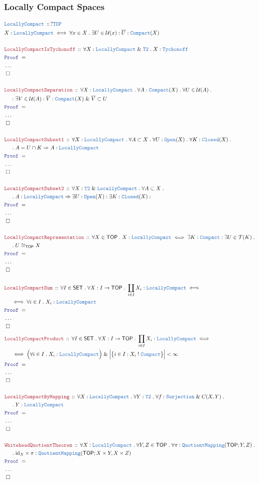 \documentclass[12pt]{scrartcl}
\newcommand{\TYPE}[1]{\textcolor{NavyBlue}{\mathtt{#1}}}
\newcommand{\LOGIC}[1]{\textcolor{Blue}{\mathtt{#1}}}
\newcommand{\THM}[1]{\textcolor{Maroon}{\mathtt{#1}}}
\renewcommand{\.}{\; . \;}
\newcommand{\IsNot}{\; ! \;}
\newcommand{\Theorem}[2]{& \THM{#1} \, :: \, #2 \\ & \Proof = \\ }
\newcommand{\DeclareType}[2]{& \TYPE{#1} \, :: \, #2 \\}
\newcommand{\DefineType}[3]{& #1 : \TYPE{#2} \iff #3 \\}
\newcommand{\NewLine}{\\ & \kern 1pc}
\newcommand{\Page}[1]{ \begin{align*} #1 \end{align*}   }
\newcommand{\NoProof}{ & \ldots \\ \EndProof}
\renewcommand{\And}{\; \& \;}
\newcommand{\Imply}{\Rightarrow}
\DeclareMathOperator*{\id}{id}
\newcommand{\QED}{\; \square}
\newcommand{\EndProof}{& \QED \\}
\newcommand{\Proof}{\LOGIC{Proof} \; }
\newcommand{\SET}{\mathsf{SET}}
\newcommand{\TOP}{\mathsf{TOP}}
\newcommand{\T}{\mathcal{T}}
\newcommand{\U}{\mathcal{U}}
\begin{document}
\subsubsection{Locally Compact Spaces}
\Page{
	\DeclareType{LocallyCompact}{?\TYPE{TOP}}
	\DefineType{X}{LocallyCompact}{\forall x \in X \. \exists U \in \U(x) : \overline{U} : \TYPE{Compact}(X) }
	\\
	\Theorem{LocallyCompactIsTychonoff}{\forall X : \TYPE{LocallyCompact} \And \TYPE{T2} \. X : \TYPE{Tychonoff} }
	\NoProof
	\\
	\Theorem{LocallyCompactSeparation}
	{
		\forall X : \TYPE{LocallyCompact} \.
		\forall A : \TYPE{Compact}(X) \.
		\forall U \in \U(A) \. \NewLine : 
		\exists V \in \U(A) : 
		\overline{V} : \TYPE{Compact}(X) \And \overline{V} \subset U
	}
	\NoProof
	\\
	\Theorem{LocallyCompactSubset1}
	{
		\forall X : \TYPE{LocallyCompact} \.
		\forall A \subset X \.
		\forall U : \TYPE{Open}(X) \.
		\forall K : \TYPE{Closed}(X) \. \NewLine \. 
		A = U \cap K \Imply  A : \TYPE{LocallyCompact}
	}
	\NoProof
	\\
	\Theorem{LocallyCompactSubset2}
	{
		\forall X : \TYPE{T2} \And \TYPE{LocallyCompact} \.
		\forall A \subset X \. \NewLine \.
		A : \TYPE{LocallyCompact} \Imply \exists U : \TYPE{Open}(X) :
		\exists K : \TYPE{Closed}(X) :
	}
	\NoProof
	\\
	\Theorem{LocallyCompactRepresentation}
	{
		\forall X  \in \TOP \.
		X : \TYPE{LocallyCompact} \iff \exists K : \TYPE{Compact} : \exists U \in \T(K) \. 
		\NewLine \.
		U \cong_{\TOP} X
	}
	\NoProof
	\\
	\Theorem{LocallyCompactSum}
	{
		\forall I \in \SET \. \forall X : I \to \TOP \. 
		\coprod_{i\in I} X_i : \TYPE{LocallyCompact} \iff \NewLine \iff 
		\forall i \in I \. X_i : \TYPE{LocallyCompact}
	}
	\NoProof
}\Page{
	\Theorem{LocallyCompactProduct}
	{
		\forall I \in \SET \. \forall X : I \to \TOP \. 
		\prod_{i\in I} X_i : \TYPE{LocallyCompact} \iff \NewLine \iff 
		\Big(\forall i \in I \. X_i : \TYPE{LocallyCompact} \Big)
		\And  \Big|\big\{ i \in I : X_i \IsNot \TYPE{Compact}  \big\}\Big| < \infty
	}
	\NoProof
	\\
	\Theorem{LocallyCompactByMapping}
	{
		\forall X : \TYPE{LocallyCompact} \.
		\forall Y : \TYPE{T2} \.
		\forall f : \TYPE{Surjection} \And C(X,Y) \. \NewLine \.
		Y : \TYPE{LocallyCompact}
	}
	\NoProof
	\\
	\Theorem{WhiteheadQuotientTheorem}
	{
		\forall X : \TYPE{LocallyCompact} \.
		\forall Y,Z \in \TOP \.
		\forall \pi : \TYPE{QuotientMapping}(\TOP;Y,Z) \. \NewLine \. 
		{\id}_X \times \pi : \TYPE{QuotientMapping}(\TOP;X \times Y,X \times Z)
	}
	\NoProof
}
\newpage
\end{document}
